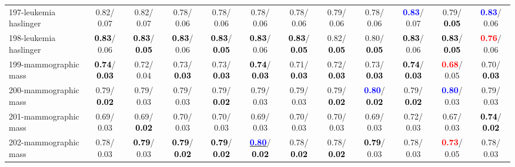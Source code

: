 \begin{table}[h]
\begin{center}
{\begin{tabular}{lc|c|c|c|c|c|c|c|c|c|c}
197-leukemia haslinger &   0.82/  0.07 &   0.82/  0.07 &   0.78/  0.06 &   0.78/  0.06 &   0.78/  0.06 &   0.78/  0.06 &   0.79/  0.06 &   0.78/  0.06 & \textcolor{blue}{\textbf{  0.83}}/  0.07 &   0.79/\textcolor{black}{\textbf{  0.05}} & \textcolor{blue}{\textbf{  0.83}}/  0.06 \\
198-leukemia haslinger & \textcolor{black}{\textbf{  0.83}}/  0.06 & \textcolor{black}{\textbf{  0.83}}/\textcolor{black}{\textbf{  0.05}} & \textcolor{black}{\textbf{  0.83}}/  0.06 & \textcolor{black}{\textbf{  0.83}}/\textcolor{black}{\textbf{  0.05}} & \textcolor{black}{\textbf{  0.83}}/  0.06 & \textcolor{black}{\textbf{  0.83}}/\textcolor{black}{\textbf{  0.05}} &   0.82/\textcolor{black}{\textbf{  0.05}} &   0.80/\textcolor{black}{\textbf{  0.05}} & \textcolor{black}{\textbf{  0.83}}/  0.06 & \textcolor{black}{\textbf{  0.83}}/\textcolor{black}{\textbf{  0.05}} & \textcolor{red}{\textbf{  0.76}}/  0.06 \\
199-mammographic mass & \textcolor{black}{\textbf{  0.74}}/\textcolor{black}{\textbf{  0.03}} &   0.72/  0.04 &   0.73/\textcolor{black}{\textbf{  0.03}} &   0.73/\textcolor{black}{\textbf{  0.03}} & \textcolor{black}{\textbf{  0.74}}/\textcolor{black}{\textbf{  0.03}} &   0.71/\textcolor{black}{\textbf{  0.03}} &   0.72/\textcolor{black}{\textbf{  0.03}} &   0.73/\textcolor{black}{\textbf{  0.03}} & \textcolor{black}{\textbf{  0.74}}/\textcolor{black}{\textbf{  0.03}} & \textcolor{red}{\textbf{  0.68}}/  0.05 &   0.70/\textcolor{black}{\textbf{  0.03}} \\ \hline
200-mammographic mass &   0.79/\textcolor{black}{\textbf{  0.02}} &   0.79/  0.03 &   0.79/  0.03 &   0.79/\textcolor{black}{\textbf{  0.02}} &   0.79/  0.03 &   0.79/  0.03 &   0.79/\textcolor{black}{\textbf{  0.02}} & \textcolor{blue}{\textbf{  0.80}}/\textcolor{black}{\textbf{  0.02}} &   0.79/\textcolor{black}{\textbf{  0.02}} & \textcolor{blue}{\textbf{  0.80}}/  0.03 &   0.79/  0.03 \\
201-mammographic mass &   0.69/  0.03 &   0.69/\textcolor{black}{\textbf{  0.02}} &   0.70/  0.03 &   0.70/  0.03 &   0.69/  0.03 &   0.70/  0.03 &   0.70/  0.03 &   0.69/  0.03 &   0.72/  0.03 &   0.67/  0.03 & \textcolor{black}{\textbf{  0.74}}/\textcolor{black}{\textbf{  0.02}} \\
202-mammographic mass &   0.78/  0.03 & \textcolor{black}{\textbf{  0.79}}/  0.03 & \textcolor{black}{\textbf{  0.79}}/\textcolor{black}{\textbf{  0.02}} & \textcolor{black}{\textbf{  0.79}}/\textcolor{black}{\textbf{  0.02}} & \underline{\textcolor{blue}{\textbf{  0.80}}}/\textcolor{black}{\textbf{  0.02}} &   0.78/\textcolor{black}{\textbf{  0.02}} &   0.78/\textcolor{black}{\textbf{  0.02}} & \textcolor{black}{\textbf{  0.79}}/  0.03 &   0.78/  0.03 & \textcolor{red}{\textbf{  0.73}}/  0.05 &   0.78/  0.03 \\

\end{tabular}}
\end{center}
\end{table}
